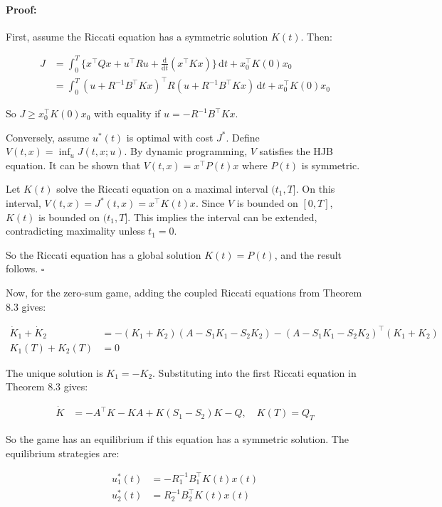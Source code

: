 \documentclass[3p]{elsarticle}
\newenvironment{proof}{\paragraph{Proof:}}{\hfill$\square$}
\begin{document}
\begin{proof}
First, assume the Riccati equation has a symmetric solution $K(t)$. Then:

\begin{align*}
J &= \int_0^T\{x^\top Qx + u^\top Ru + \frac{\mathrm{d}}{\mathrm{d}t}(x^\top K x)\}\,\mathrm{d}t + x_0^\top K(0) x_0 \\
    &= \int_0^T (u + R^{-1}B^\top Kx)^\top R(u + R^{-1}B^\top Kx)\,\mathrm{d}t + x_0^\top K(0) x_0
\end{align*}

So $J \geq x_0^\top K(0) x_0$ with equality if $u=-R^{-1}B^\top Kx$.

Conversely, assume $u^*(t)$ is optimal with cost $J^*$. Define $V(t,x) = \inf_{u} J(t,x;u)$. By dynamic programming, $V$ satisfies the HJB equation. It can be shown that $V(t,x) = x^\top P(t) x$ where $P(t)$ is symmetric. 

Let $K(t)$ solve the Riccati equation on a maximal interval $(t_1,T]$. On this interval, $V(t,x) = J^*(t,x) = x^\top K(t) x$. Since $V$ is bounded on $[0,T]$, $K(t)$ is bounded on $(t_1,T]$. This implies the interval can be extended, contradicting maximality unless $t_1=0$.

So the Riccati equation has a global solution $K(t)=P(t)$, and the result follows.
\end{proof}

Now, for the zero-sum game, adding the coupled Riccati equations from Theorem 8.3 gives:

\begin{align*}
\dot{K}_1 + \dot{K}_2 &= - (K_1 + K_2)(A - S_1K_1 - S_2K_2) - (A - S_1K_1 - S_2K_2)^\top(K_1 + K_2) \\
K_1(T) + K_2(T) &= 0
\end{align*}

The unique solution is $K_1 = -K_2$. Substituting into the first Riccati equation in Theorem 8.3 gives:

\begin{align*}
\dot{K}
 &= -A^\top K - KA + K(S_1-S_2)K - Q, \quad K(T) = Q_T  
\end{align*}

So the game has an equilibrium if this equation has a symmetric solution. The equilibrium strategies are:

\begin{align*}
u_1^*(t) &= -R_1^{-1}B_1^\top K(t) x(t) \\
u_2^*(t) &= R_2^{-1}B_2^\top K(t) x(t)
\end{align*}
\end{document}
